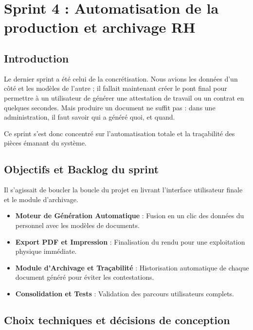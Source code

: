
\chapter{Sprint 4 : Automatisation de la production et archivage RH}

\section{Introduction}

Le dernier sprint a été celui de la concrétisation. Nous avions les données d'un côté et les modèles de l'autre ; il fallait maintenant créer le pont final pour permettre à un utilisateur de générer une attestation de travail ou un contrat en quelques secondes. Mais produire un document ne suffit pas : dans une administration, il faut savoir qui a généré quoi, et quand.

Ce sprint s'est donc concentré sur l'automatisation totale et la traçabilité des pièces émanant du système.

\section{Objectifs et Backlog du sprint}

Il s'agissait de boucler la boucle du projet en livrant l'interface utilisateur finale et le module d'archivage.

\begin{itemize}
    \item \textbf{Moteur de Génération Automatique} : Fusion en un clic des données du personnel avec les modèles de documents.
    \item \textbf{Export PDF et Impression} : Finalisation du rendu pour une exploitation physique immédiate.
    \item \textbf{Module d'Archivage et Traçabilité} : Historisation automatique de chaque document généré pour éviter les contestations.
    \item \textbf{Consolidation et Tests} : Validation des parcours utilisateurs complets.
\end{itemize}

\section{Choix techniques et décisions de conception}

